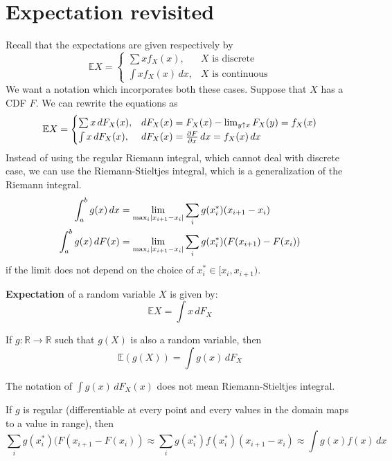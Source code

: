 \documentclass{huhtakm-template-book}
\newcommand{\expect}{\mathbb{E}}
\begin{document}
\section{Expectation revisited}
Recall that the expectations are given respectively by
\begin{equation*}
	\expect X=\begin{cases}
		\sum xf_{X}(x), &X\text{ is discrete}\\
		\int xf_{X}(x)\,dx, &X\text{ is continuous}
	\end{cases}
\end{equation*}
We want a notation which incorporates both these cases. Suppose that $X$ has a CDF $F$. We can rewrite the equations as
\begin{equation*}
	\expect X=\begin{cases}
		\sum x\,dF_{X}(x), &dF_{X}(x)=F_{X}(x)-\lim_{y\uparrow x}F_{X}(y)=f_{X}(x)\\
		\int x\,dF_{X}(x), &dF_{X}(x)=\pdv{F}{x}\,dx=f_{X}(x)\,dx
	\end{cases}
\end{equation*}
Instead of using the regular Riemann integral, which cannot deal with discrete case, we can use the Riemann-Stieltjes integral, which is a generalization of the Riemann integral.
\begin{align*}
	\int_{a}^{b}g(x)\,dx&=\lim_{\max_{i}\left|{x_{i+1}-x_{i}}\right|}\sum_{i}g(x_{i}^{*})(x_{i+1}-x_{i})\\
	\int_{a}^{b}g(x)\,dF(x)&=\lim_{\max_{i}\left|{x_{i+1}-x_{i}}\right|}\sum_{i}g(x_{i}^{*})(F(x_{i+1})-F(x_{i}))
\end{align*}
if the limit does not depend on the choice of $x_{i}^{*}\in[x_{i},x_{i+1})$.
\begin{defn}
	\textbf{Expectation} of a random variable $X$ is given by:
	\begin{equation*}
		\expect X=\int x\,dF_{X}
	\end{equation*}
\end{defn}
\begin{lem}
	If $g:\mathbb{R}\to\mathbb{R}$ such that $g(X)$ is also a random variable, then
	\begin{equation*}
		\expect(g(X))=\int g(x)\,dF_{X}
	\end{equation*}
\end{lem}
\begin{rem}
	The notation of $\int g(x)\,dF_{X}(x)$ does not mean Riemann-Stieltjes integral.
\end{rem}
\begin{eg}
	If $g$ is regular (differentiable at every point and every values in the domain maps to a value in range), then
	\begin{equation*}
		\sum_{i}g(x_{i}^{*})(F(x_{i+1}-F(x_{i}))\approx\sum_{i}g(x_{i}^{*})f(x_{i}^{*})(x_{i+1}-x_{i})\approx\int g(x)f(x)\,dx
	\end{equation*}
\end{eg}
\end{document}
